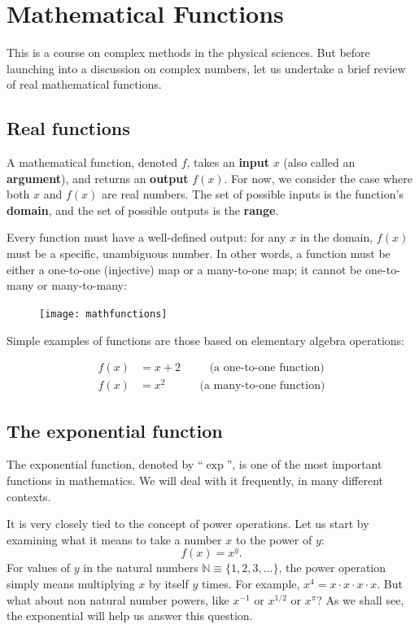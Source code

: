 \documentclass[10pt,a4paper]{article}
\begin{document}
    
\section{Mathematical Functions}
\label{mathematical-functions}

This is a course on complex methods in the physical sciences. But
before launching into a discussion on complex numbers, let us
undertake a brief review of real mathematical functions.

\subsection{Real functions}\label{real-functions}

A mathematical function, denoted $f$, takes an \textbf{input} $x$
(also called an \textbf{argument}), and returns an \textbf{output}
$f(x)$. For now, we consider the case where both $x$ and $f(x)$ are
real numbers. The set of possible inputs is the function's
\textbf{domain}, and the set of possible outputs is the
\textbf{range}.

Every function must have a well-defined output: for any $x$ in the
domain, $f(x)$ must be a specific, unambiguous number. In other words,
a function must be either a one-to-one (injective) map or a
many-to-one map; it cannot be one-to-many or many-to-many:

\begin{figure}[ht]
  \centering\texttt{[image: mathfunctions]}
\end{figure}

Simple examples of functions are those based on elementary algebra
operations:

\begin{align*}
  f(x) &= x + 2 \;\;\qquad \text{(a one-to-one function)} \\
  f(x) &= x^2 \quad\qquad \text{(a many-to-one function)}
\end{align*}

\subsection{The exponential function}
\label{exponential_function}

The exponential function, denoted by ``$\exp$'', is one of the most
important functions in mathematics. We will deal with it frequently,
in many different contexts.

It is very closely tied to the concept of power operations. Let us
start by examining what it means to take a number $x$ to the power of
$y$:
\begin{equation}
  f(x) = x^y.
\end{equation}
For values of $y$ in the natural numbers $\mathbb{N} \equiv
\{1,2,3,\dots\}$, the power operation simply means multiplying $x$ by
itself $y$ times.  For example, $x^4 = x \cdot x \cdot x \cdot x$.
But what about non natural number powers, like $x^{-1}$ or $x^{1/2}$
or $x^{\pi}$? As we shall see, the exponential will help us answer
this question.
\end{document}
